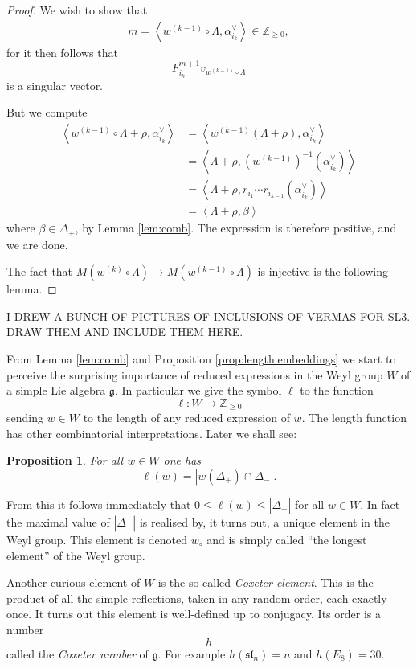 \documentclass[12pt]{article}
\theoremstyle{plain}
\newtheorem{prop}[thm]{Proposition}
\theoremstyle{definition}
\numberwithin{equation}{section}
\newcommand{\al}{\alpha}
\newcommand{\La}{\Lambda}
\newcommand{\D}{\Delta}
\newcommand{\Z}{\mathbb{Z}}
\newcommand{\g}{\mathfrak{g}}
\newcommand{\sll}{\mathfrak{sl}}
\begin{document}
\begin{proof}
We wish to show that
\begin{align*}
m = \left< w^{(k-1)} \circ \La, \al_{i_k}^\vee \right> \in \Z_{\geq 0},
\end{align*}
for it then follows that
\[
F_{i_k}^{m+1} v_{w^{(k-1)} \circ \La}
\]
is a singular vector.

But we compute
\begin{align*}
\left< w^{(k-1)} \circ \La + \rho, \al_{i_k}^\vee \right>
%
&= \left< w^{(k-1)} (\La + \rho), \al_{i_k}^\vee \right> \\
%
&= \left< \La + \rho, (w^{(k-1)})^{-1}(\al_{i_k}^\vee) \right> \\
%
&= \left< \La + \rho, r_{i_{1}} \cdots r_{i_{k-1}}(\al_{i_k}^\vee) \right> \\
%
&= \left< \La + \rho, \beta \right>
\end{align*}
where $\beta \in \D_+$, by Lemma \ref{lem:comb}. The expression is therefore positive, and we are done.

The fact that $M(w^{(k)} \circ \La) \rightarrow M(w^{(k-1)} \circ \La)$ is injective is the following lemma.
\end{proof}




{\color{blue}I DREW A BUNCH OF PICTURES OF INCLUSIONS OF VERMAS FOR SL3. DRAW THEM AND INCLUDE THEM HERE.}

From Lemma \ref{lem:comb} and Proposition \ref{prop:length.embeddings} we start to perceive the surprising importance of reduced expressions in the Weyl group $W$ of a simple Lie algebra $\g$. In particular we give the symbol $\ell$ to the function
\[
\ell : W \rightarrow \Z_{\geq 0}
\]
sending $w \in W$ to the length of any reduced expression of $w$. The length function has other combinatorial interpretations. Later we shall see:
\begin{prop}\label{prop:wD+D-ell}
For all $w \in W$ one has
\[
\ell(w) = |w(\D_+) \cap \D_-|.
\]
\end{prop}
From this it follows immediately that $0 \leq \ell(w) \leq |\D_+|$ for all $w \in W$. In fact the maximal value of $|\D_+|$ is realised by, it turns out, a unique element in the Weyl group. This element is denoted $w_\circ$ and is simply called ``the longest element'' of the Weyl group.

Another curious element of $W$ is the so-called \emph{Coxeter element}. This is the product of all the simple reflections, taken in any random order, each exactly once. It turns out this element is well-defined up to conjugacy. Its order is a number
\[
h
\]
called the \emph{Coxeter number} of $\g$. For example $h(\sll_n) = n$ and $h(E_8) = 30$.
\end{document}
